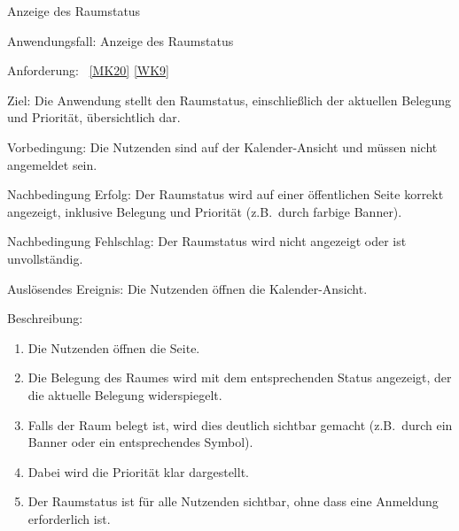 \begin{function}{80}{Anzeige des Raumstatus}
    \item[Anwendungsfall:] Anzeige des Raumstatus
    \item[Anforderung:] ~\ref{MK20} \ref{WK9}
    \item[Ziel:] Die Anwendung stellt den Raumstatus, einschließlich der aktuellen Belegung und Priorität, übersichtlich dar.
    \item[Vorbedingung:] Die Nutzenden sind auf der Kalender-Ansicht und müssen nicht angemeldet sein.
    \item[Nachbedingung Erfolg:] Der Raumstatus wird auf einer öffentlichen Seite korrekt angezeigt, inklusive Belegung und Priorität (z.B.\ durch farbige Banner).
    \item[Nachbedingung Fehlschlag:] Der Raumstatus wird nicht angezeigt oder ist unvollständig.
    \item[Auslösendes Ereignis:] Die Nutzenden öffnen die Kalender-Ansicht.
    \item[Beschreibung:] ~
    \begin{enumerate}
        \item Die Nutzenden öffnen die Seite.
        \item Die Belegung des Raumes wird mit dem entsprechenden Status angezeigt, der die aktuelle Belegung widerspiegelt.
        \item Falls der Raum belegt ist, wird dies deutlich sichtbar gemacht (z.B.\ durch ein Banner oder ein entsprechendes Symbol).
        \item Dabei wird die Priorität klar dargestellt.
        \item Der Raumstatus ist für alle Nutzenden sichtbar, ohne dass eine Anmeldung erforderlich ist.
    \end{enumerate}
\end{function}

\pagebreak


